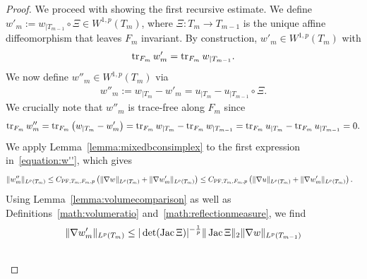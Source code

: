 \documentclass[10pt,a4paper]{article}
\begin{document}
\begin{proof}
    We proceed with showing the first recursive estimate. 
    We define $w'_{m} := w_{|T_{m-1}} \circ \Xi \in W^{1,p}(T_{m})$,
    where $\Xi : T_{m} \rightarrow T_{m-1}$ is the unique affine diffeomorphism that leaves $F_{m}$ invariant. 
    By construction, $w'_{m} \in W^{1,p}(T_{m})$ with 
    \begin{align*}
        \operatorname{tr}_{F_{m}} w'_{m} = \operatorname{tr}_{F_{m}} w_{|T_{m-1}}
        .
    \end{align*}
    We now define $w''_{m} \in W^{1,p}(T_{m})$ via 
    \begin{align}\label{equation:w''}
        w''_{m} 
        := 
        w_{|T_{m}} - w'_{m} = u_{|T_{m}} - u_{|T_{m-1}} \circ \Xi.
    \end{align}
    We crucially note that $w''_{m}$ is trace-free along $F_{m}$ since
    \begin{align*}
        \operatorname{tr}_{F_{m}} w''_{m} 
        = 
        \operatorname{tr}_{F_{m}} \left( 
            w_{|T_{m}} - w'_{m} 
        \right) 
        =
        \operatorname{tr}_{F_{m}} w_{|T_{m}}
        -
        \operatorname{tr}_{F_{m}} w_{|T_{m-1}}
        =
        \operatorname{tr}_{F_{m}} u_{|T_{m}}
        -
        \operatorname{tr}_{F_{m}} u_{|T_{m-1}}
        = 0.
    \end{align*}
    We apply Lemma~\ref{lemma:mixedbconsimplex} to the first expression in~\eqref{equation:w''}, which gives 
    \begin{align*}
        \| w''_{m} \|_{L^{p}(T_{m})} 
        &
        \leq 
        C_{{\rm PF},T_{m},F_{m},p} 
        \left( 
            \| \nabla w \|_{L^{p}(T_{m})} 
            + 
            \| \nabla w'_{m} \|_{L^{p}(T_{m})} 
        \right) 
        \leq 
        C_{{\rm PF},T_{m},F_{m},p} 
        \left( 
            \| \nabla u \|_{L^{p}(T_{m})} 
            + 
            \| \nabla w'_{m} \|_{L^{p}(T_{m})} 
        \right) 
        .
    \end{align*}
    Using Lemma~\ref{lemma:volumecomparison} as well as Definitions~\eqref{math:volumeratio} and~\eqref{math:reflectionmeasure}, we find 
    \begin{align*}
        \| \nabla w'_{m} \|_{L^{p}(T_{m})}
        &
        \leq 
        |\det(\Jacobian \Xi  )|^{-\frac 1 p} 
        \matnorm{ \Jacobian \Xi }
        \| \nabla w \|_{L^{p}(T_{m-1})}
        \\&

\end{align*}
\end{proof}
\end{document}
